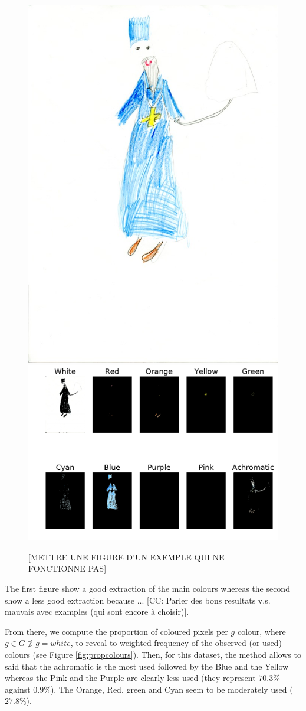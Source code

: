 \documentclass[11pt,a4paper]{article}
\begin{document}
\begin{figure}[!h]
	\centering
	\includegraphics[width=0.32\linewidth]{figures/ru08_bo_f_pb_07_05_don-r}
	\includegraphics[width=0.62\linewidth]{figures/ru08_bo_f_pb_07_05_don-rno_filter_mask.pdf}
	\caption{{[METTRE UNE FIGURE D'UN EXEMPLE QUI NE FONCTIONNE PAS]} }
	\label{fig:example2}
\end{figure}

\noindent The first figure show a good extraction of the main colours whereas the second show a less good extraction because ... [CC:  Parler des bons resultats v.s. mauvais avec examples (qui sont encore \`a choisir)].

From there, we compute the proportion of coloured pixels per $g$ colour, where $g \in G \not\ni g = white$, to reveal to weighted frequency of the observed (or used) colours (see Figure \ref{fig:propcolours}). Then, for this dataset, the method allows to said that the achromatic is the most used followed by the Blue and the Yellow whereas the Pink and the Purple are clearly less used (they represent $70.3\%$ against $0.9\%$). The Orange, Red, green and Cyan seem to be moderately used ($27.8\%$).
\end{document}
